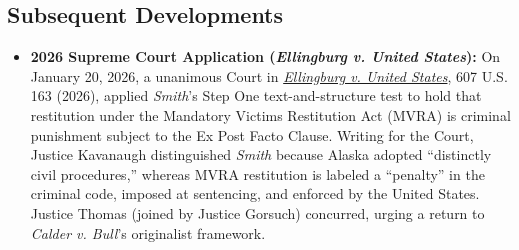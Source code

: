 \documentclass[12pt]{article}
\begin{document}
\subsection{Subsequent Developments}

\begin{itemize}

\item \textbf{2026 Supreme Court Application (\textit{Ellingburg v. United States}):} On January 20, 2026, a unanimous Court in \href{https://www.law.cornell.edu/supremecourt/text/24-482}{\textit{Ellingburg v. United States}}, 607 U.S. 163 (2026), applied \textit{Smith}'s Step One text-and-structure test to hold that restitution under the Mandatory Victims Restitution Act (MVRA) is criminal punishment subject to the Ex Post Facto Clause. Writing for the Court, Justice Kavanaugh distinguished \textit{Smith} because Alaska adopted ``distinctly civil procedures,'' whereas MVRA restitution is labeled a ``penalty'' in the criminal code, imposed at sentencing, and enforced by the United States. Justice Thomas (joined by Justice Gorsuch) concurred, urging a return to \textit{Calder v. Bull}'s originalist framework.

\end{itemize}
\end{document}
